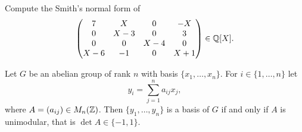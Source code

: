 \begin{exercise}
	\label{xca:Smith_Q[X]}
	Compute the Smith's normal form of
	\[
		\begin{pmatrix}
			7 & X & 0 & -X \\
			0 & X-3 & 0 & 3\\
			0 & 0 & X-4 & 0 \\
			X-6 & -1 & 0 & X+1 
		\end{pmatrix}\in\mathbb{Q}[X].
	\]
\end{exercise}

\begin{exercise}
\label{xca:unimodular}
    Let $G$ be an abelian group of rank $n$ with basis $\{x_1,\dots,x_n\}$. For
    $i\in\{1,\dots,n\}$ let 
    \[
    y_i=\sum_{j=1}^n a_{ij}x_j,
    \]
    where $A=(a_{ij})\in M_n(\mathbb{Z})$. Then $\{y_1,\dots,y_n\}$ is a basis of $G$ 
    if and only if $A$ is unimodular, that is $\det A\in\{-1,1\}$. 
\end{exercise}

